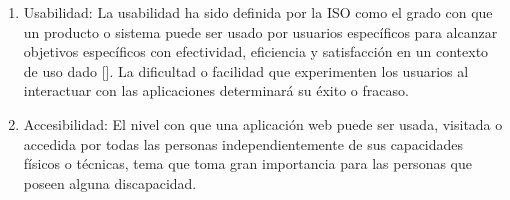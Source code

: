 \begin{enumerate}
\item Usabilidad: La usabilidad ha sido definida por la ISO como el grado con que un producto o sistema puede ser usado por usuarios específicos para alcanzar objetivos específicos con efectividad, eficiencia y satisfacción en un contexto de uso dado [\cite{33}]. La dificultad o facilidad que experimenten los usuarios al interactuar con las aplicaciones determinará su éxito o fracaso.
\item Accesibilidad: El nivel con que una aplicación web puede ser usada, visitada o accedida por todas las personas independientemente de sus capacidades físicos o técnicas, tema que toma gran importancia para las personas que poseen alguna discapacidad.


\end{enumerate}



